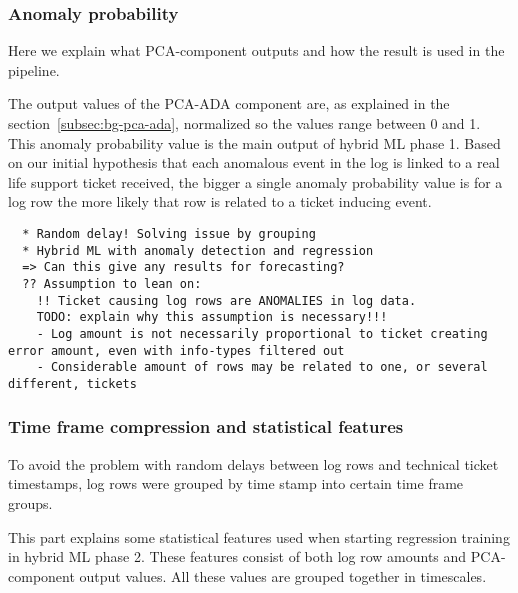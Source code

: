 \subsubsection*{Anomaly probability}
\begin{itcomment}
    Here we explain what PCA-component outputs and how the result is used in the pipeline.
\end{itcomment}

The output values of the PCA-ADA component are,
as explained in the section~\ref{subsec:bg-pca-ada},
normalized so the values range between 0 and 1.
This anomaly probability value
is the main output of hybrid ML phase 1.
Based on our initial hypothesis
that each anomalous event in the log
is linked to a real life support ticket received,
the bigger a single anomaly probability value is for a log row
the more likely that row is related to a ticket inducing event.


\begin{verbatim}
  * Random delay! Solving issue by grouping
  * Hybrid ML with anomaly detection and regression
  => Can this give any results for forecasting?
  ?? Assumption to lean on:
    !! Ticket causing log rows are ANOMALIES in log data.
    TODO: explain why this assumption is necessary!!!
    - Log amount is not necessarily proportional to ticket creating error amount, even with info-types filtered out
    - Considerable amount of rows may be related to one, or several different, tickets
\end{verbatim}



\subsubsection*{Time frame compression and statistical features}
To avoid the problem with random delays
between log rows and technical ticket timestamps,
log rows were grouped by time stamp
into certain time frame groups. %

\begin{itcomment}
    This part explains some statistical features used when starting regression training
    in hybrid ML phase 2.
    These features consist of both log row amounts
    and PCA-component output values.
    All these values are grouped together in timescales.
\end{itcomment}

